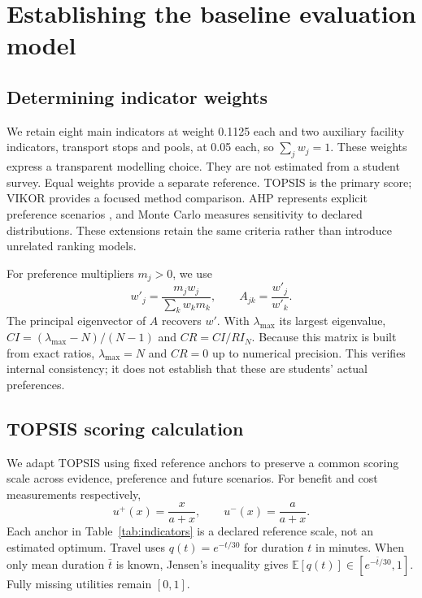 \section{Establishing the baseline evaluation model}
\subsection{Determining indicator weights}
We retain eight main indicators at weight 0.1125 each and two auxiliary facility
indicators, transport stops and pools, at 0.05 each, so $\sum_jw_j=1$.
These weights express a transparent modelling choice. They are not estimated
from a student survey. Equal weights provide a separate reference.
TOPSIS is the primary score; VIKOR provides a focused method comparison.
AHP represents explicit preference scenarios \cite{saaty}, and Monte Carlo measures
sensitivity to declared distributions. These extensions retain the same
criteria rather than introduce unrelated ranking models.

For preference multipliers $m_j>0$, we use
\begin{equation}
 w'_j=\frac{m_jw_j}{\sum_kw_km_k},\qquad A_{jk}=\frac{w'_j}{w'_k}.
 \label{eq:weights}
\end{equation}
The principal eigenvector of $A$ recovers $w'$. With $\lambda_{\max}$ its
largest eigenvalue, $CI=(\lambda_{\max}-N)/(N-1)$ and $CR=CI/RI_N$.
Because this matrix is built from exact ratios, $\lambda_{\max}=N$ and
$CR=0$ up to numerical precision. This verifies internal consistency;
it does not establish that these are students' actual preferences.

\subsection{TOPSIS scoring calculation}
We adapt TOPSIS \cite{topsis} using fixed reference anchors to preserve a common scoring scale across evidence,
preference and future scenarios. For benefit and cost measurements respectively,
\begin{equation}
 u^{+}(x)=\frac{x}{a+x},\qquad u^{-}(x)=\frac{a}{a+x}.
\end{equation}
Each anchor in Table~\ref{tab:indicators} is a declared reference scale, not
an estimated optimum. Travel uses $q(t)=e^{-t/30}$ for duration $t$ in minutes.
When only mean duration $\bar t$ is known, Jensen's inequality gives
$\mathbb E[q(t)]\in[e^{-\bar t/30},1]$. Fully missing utilities remain $[0,1]$.

